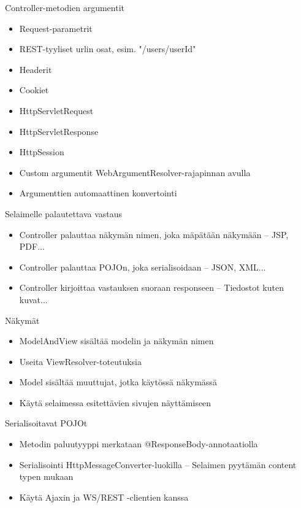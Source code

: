\documentclass[hyperref={pdfauthor=\AUTHOR},14pt]{beamer}
\begin{document}
\begin{frame}[t, fragile]{Controller-metodien argumentit}
\begin{itemize}
\item Request-parametrit
\item REST-tyyliset urlin osat, esim. "/users/{userId}"
\item Headerit
\item Cookiet
\item HttpServletRequest
\item HttpServletResponse
\item HttpSession
\item Custom argumentit WebArgumentResolver-rajapinnan avulla
\item Argumenttien automaattinen konvertointi
\end{itemize}
\end{frame}

\begin{frame}[t, fragile]{Selaimelle palautettava vastaus}
\begin{itemize}
\item Controller palauttaa näkymän nimen, joka mäpätään näkymään
-- JSP, PDF...
\item Controller palauttaa POJOn, joka serialisoidaan
-- JSON, XML...
\item Controller kirjoittaa vastauksen suoraan responseen
-- Tiedostot kuten kuvat...
\end{itemize}
\end{frame}

\begin{frame}[t, fragile]{Näkymät}
\begin{itemize}
\item ModelAndView sisältää modelin ja näkymän nimen
\item Useita ViewResolver-toteutuksia
\item Model sisältää muuttujat, jotka käytössä näkymässä
\item Käytä selaimessa esitettävien sivujen näyttämiseen
\end{itemize}
\end{frame}

\begin{frame}[t, fragile]{Serialisoitavat POJOt}
\begin{itemize}
\item Metodin paluutyyppi merkataan @ResponseBody-annotaatiolla
\item Serialisointi HttpMessageConverter-luokilla
-- Selaimen pyytämän content typen mukaan
\item Käytä Ajaxin ja WS/REST -clientien kanssa 
\end{itemize}
\end{frame}
\end{document}
